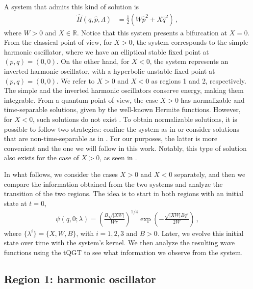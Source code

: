 \documentclass[12pt]{iopart}
\begin{document}
A system that admits this kind of solution is
\begin{align}
\hat{H}(\hat{q},\hat{p}, \Lambda)&=\frac{1}{2} \left( W \hat{p}^2 + X\hat{q}^2\right)\,, \label{firstHamil}
\end{align}
where $W>0$ and $X\in \mathbb{R}$. Notice that this system presents a bifurcation at $X=0$. From the classical point of view, for $X>0$, the system corresponds to the simple harmonic oscillator, where we have an elliptical stable fixed point at $(p, q)=(0,0)$. On the other hand, for $X<0$, the system represents an inverted harmonic oscillator, with a hyperbolic unstable fixed point at $(p, q)=(0,0)$. We refer to $X>0$ and $X<0$ as regions 1 and 2, respectively. The simple and the inverted harmonic oscillators conserve energy, making them integrable. From a quantum point of view, the case $X>0$ has normalizable and time-separable solutions, given by the well-known Hermite functions. However, for $X<0$, such solutions do not exist \cite{Barton}. To obtain normalizable solutions, it is possible to follow two strategies: confine the system as in \cite{Yuce} or consider solutions that are non-time-separable as in \cite{Ali}. For our purposes, the latter is more convenient and the one we will follow in this work. Notably, this type of solution also exists for the case of $X>0$, as seen in \cite{Griffiths}. 

In what follows, we consider the cases $X>0$ and $X<0$ separately, and then we compare the information obtained from the two systems and analyze the transition of the two regions. The idea is to start in both regions with an initial state at $t=0$,
\begin{align}
    \psi(q, 0; \lambda)=\left( \frac{B \sqrt{ |XW| }}{W \pi} \right)^{1/4} \exp \left(- \frac{ \sqrt{ |XW| } B q^2}{2 W}\right)\,,
    \label{inicial}
\end{align}
where $\{\lambda^i\}=\{X,W,B\}$, with $i=1,2,3$ and $B>0$. Later, we evolve this initial state over time with the system's kernel. We then analyze the resulting wave functions using the tQGT to see what information we observe from the system.

\subsection{Region 1: harmonic oscillator}
\end{document}
